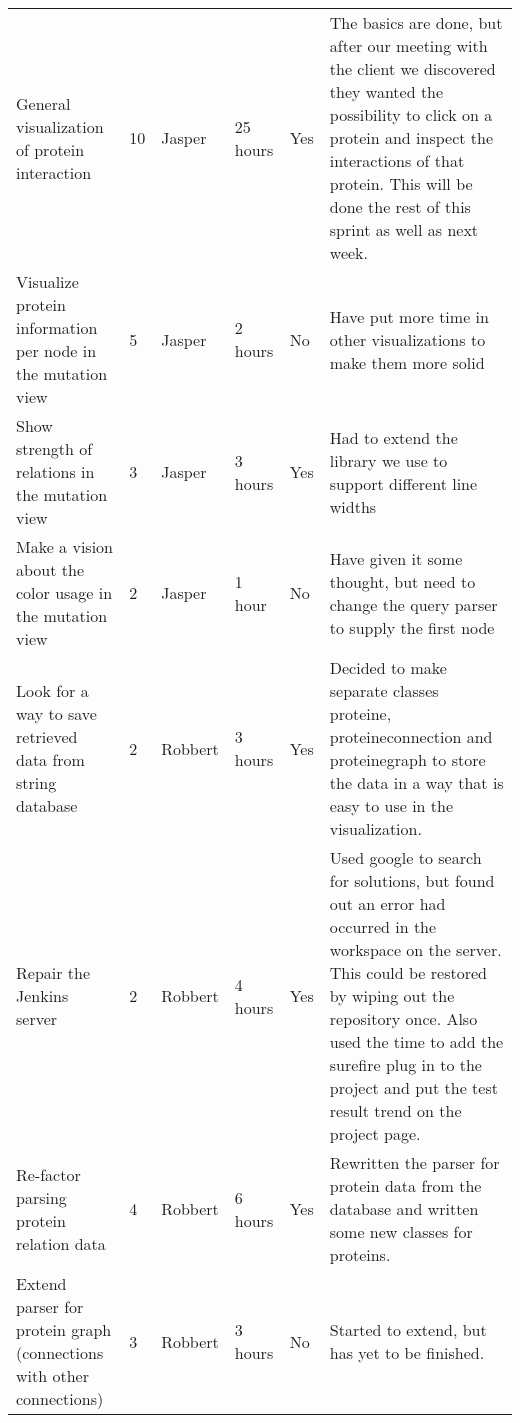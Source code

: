 \documentclass[a4paper]{report}
\begin{document}
\begin{landscape}
\begin{longtable}{p{6cm}|l|l|l|p{2cm}|p{7cm}}
General visualization of protein interaction & 10 & Jasper & 25 hours & Yes & The basics are done, but after our meeting with the client we discovered they wanted the possibility to click on a protein and inspect the interactions of that protein. This will be done the rest of this sprint as well as next week.\\
Visualize protein information per node in the mutation view & 5 & Jasper & 2 hours & No & Have put more time in other visualizations to make them more solid\\
Show strength of relations in the mutation view & 3 & Jasper & 3 hours & Yes & Had to extend the library we use to support different line widths\\
Make a vision about the color usage in the mutation view & 2 & Jasper & 1 hour & No & Have given it some thought, but need to change the query parser to supply the first node\\
Look for a way to save retrieved data from string database & 2 & Robbert & 3 hours & Yes & Decided to make separate classes proteine, proteineconnection and proteinegraph to store the data in a way that is easy to use in the visualization. \\
Repair the Jenkins server & 2 & Robbert & 4 hours & Yes & Used google to search for solutions, but found out an error had occurred in the workspace on the server. This could be restored by wiping out the repository once. Also used the time to add the surefire plug in to the project and put the test result trend on the project page. \\
Re-factor parsing protein relation data & 4 & Robbert & 6 hours & Yes & Rewritten the parser for protein data from the database and written some new classes for proteins. \\
Extend parser for protein graph (connections with other connections) & 3 & Robbert & 3 hours & No & Started to extend, but has yet to be finished.
\end{longtable}
\end{landscape}
\end{document}
